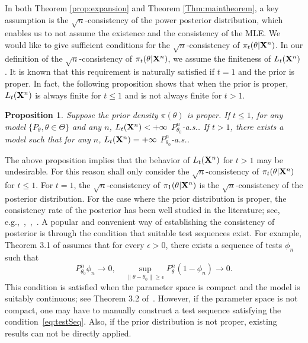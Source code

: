 \documentclass[11pt]{article}
\theoremstyle{plain}
\newtheorem{proposition}{\quad\quad Proposition}
\theoremstyle{definition}
\theoremstyle{remark}
\begin{document}
In both Theorem \ref{prop:expansion} and Theorem \ref{Thm:maintheorem},
a key assumption is the $\sqrt{n}$-consistency of the power posterior distribution, which enables us to not assume the existence and the consistency of the MLE.
We would like to give sufficient conditions for the $\sqrt{n}$-consistency of $\pi_t(\theta|\mathbf{X}^{n})$.
In our definition of the $\sqrt{n}$-consistency of $\pi_t(\theta| \mathbf{X}^n)$, we assume the finiteness of $L_t(\mathbf{X}^n)$.
It is known that this requirement is naturally satisfied if $t=1$ and the prior is proper.
In fact, the following proposition shows that when the prior is proper, $L_t(\mathbf{X}^n)$ is always finite for $t\leq 1$ and is not always finite for $t>1$.
\begin{proposition}
    Suppose the prior density $\pi(\theta)$ is proper.
    If $t\leq 1$, for any model $\{P_{\theta}, \theta \in \Theta \}$ and any $n$, $L_t(\mathbf{X}^{n})< +\infty$ $P_{\theta_0}^n$-a.s..
    If $t> 1$, there exists a model such that for any $n$, $L_t(\mathbf{X}^{n}) = +\infty$ $P_{\theta_0}^n$-a.s..
    \label{exprop}
\end{proposition}
The above proposition implies that the behavior of $L_t(\mathbf{X}^{n})$ for $t>1$ may be undesirable.
For this reason shall only consider the $\sqrt n$-consistency of $\pi_t(\theta | \mathbf{X}^{n})$ for $t\leq 1$.
For $t=1$, the $\sqrt{n}$-consistency of $\pi_1(\theta | \mathbf{X}^{n})$ is the $\sqrt{n}$-consistency of the posterior distribution.
For the case where the prior distribution is proper,
the consistency rate of the posterior has been well studied in the literature; see, e.g.,~\cite{ghosal2000},~\cite{Shen2001Rates},~\cite{vaart2007convergence}.
A popular and convenient way of establishing the consistency of posterior is through the condition that suitable test sequences exist.
For example, Theorem 3.1 of \cite{Kleijn2012The} assumes that for every $\epsilon>0$, there exists a sequence of tests $\phi_n$ such that
\begin{equation}\label{eq:testSeq}
    P_{\theta_0}^n\phi_n\to 0,\quad \sup_{\|\theta-\theta_0\|\geq \epsilon} P_\theta^n(1-\phi_n)\to 0.
\end{equation}
This condition is satisfied when the parameter space is compact and the model is suitably continuous; see Theorem 3.2 of~\cite{Kleijn2012The}.
However, if the parameter space is not compact, one may have to manually construct a test sequence satisfying the condition~\eqref{eq:testSeq}.
Also, if the prior distribution is not proper, existing results can not be directly applied.
\end{document}
